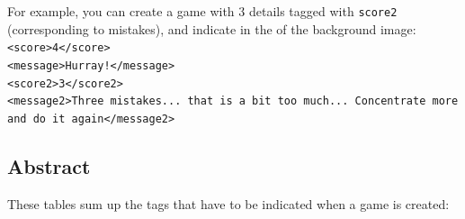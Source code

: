 For example, you can create a game with 3 details tagged with \texttt{score2}
(corresponding to mistakes), and indicate in the 
of the background image:\\
\texttt{<score>4</score>\\
<message>Hurray!</message>\\
<score2>3</score2>\\
<message2>Three mistakes... that is a bit too much... Concentrate more and do it again</message2>}\\

\newpage
\subsection{Abstract}

These tables sum up the tags that have to be indicated when a game is created:

